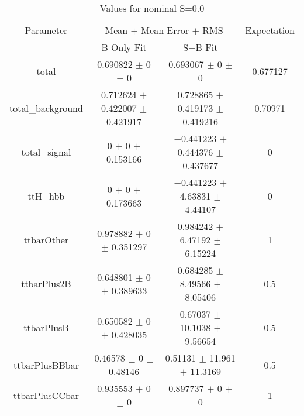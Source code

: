\begin{table}
\centering
\caption{Values for nominal S=0.0}
\begin{tabular}{cccc}
\toprule
Parameter & \multicolumn{2}{c}{Mean $\pm$ Mean Error $\pm$ RMS} & Expectation\\
 & B-Only Fit & S+B Fit & \\
\midrule
total & \num{0.690822} $\pm$ \num{0} $\pm$ \num{0} & \num{0.693067} $\pm$ \num{0} $\pm$ \num{0} & \num{0.677127}\\
total\_background & \num{0.712624} $\pm$ \num{0.422007} $\pm$ \num{0.421917} & \num{0.728865} $\pm$ \num{0.419173} $\pm$ \num{0.419216} & \num{0.70971}\\
total\_signal & \num{0} $\pm$ \num{0} $\pm$ \num{0.153166} & \num{-0.441223} $\pm$ \num{0.444376} $\pm$ \num{0.437677} & \num{0}\\
ttH\_hbb & \num{0} $\pm$ \num{0} $\pm$ \num{0.173663} & \num{-0.441223} $\pm$ \num{4.63831} $\pm$ \num{4.44107} & \num{0}\\
ttbarOther & \num{0.978882} $\pm$ \num{0} $\pm$ \num{0.351297} & \num{0.984242} $\pm$ \num{6.47192} $\pm$ \num{6.15224} & \num{1}\\
ttbarPlus2B & \num{0.648801} $\pm$ \num{0} $\pm$ \num{0.389633} & \num{0.684285} $\pm$ \num{8.49566} $\pm$ \num{8.05406} & \num{0.5}\\
ttbarPlusB & \num{0.650582} $\pm$ \num{0} $\pm$ \num{0.428035} & \num{0.67037} $\pm$ \num{10.1038} $\pm$ \num{9.56654} & \num{0.5}\\
ttbarPlusBBbar & \num{0.46578} $\pm$ \num{0} $\pm$ \num{0.48146} & \num{0.51131} $\pm$ \num{11.961} $\pm$ \num{11.3169} & \num{0.5}\\
ttbarPlusCCbar & \num{0.935553} $\pm$ \num{0} $\pm$ \num{0} & \num{0.897737} $\pm$ \num{0} $\pm$ \num{0} & \num{1}\\
\bottomrule
\end{tabular}
\end{table}